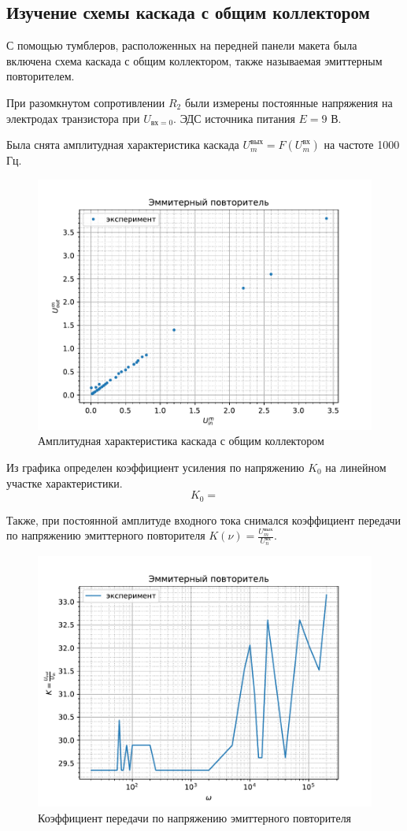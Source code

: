 \subsection{Изучение схемы каскада с общим коллектором}
С помощью тумблеров, расположенных на передней панели макета была включена схема каскада с общим коллектором, также называемая эмиттерным повторителем.

При разомкнутом сопротивлении $R_2$ были измерены постоянные напряжения на электродах транзистора при $U_{\text{вх}=0}$. 
ЭДС источника питания $E=9$ В.

Была снята амплитудная характеристика каскада 
$U_{m}^{\text{вых}}=F(U_m^{вх})$  на частоте 1000 Гц.

\begin{figure}[H]
 	\centering
 	\includegraphics[width=\linewidth]{fig/111_3.pdf}
 	\caption{Амплитудная характеристика каскада с общим коллектором}
 	\label{fig:111_3}
 \end{figure} 
 
Из графика определен коэффициент усиления по напряжению $K_0$ на линейном участке характеристики.
$$K_0=$$

Также, при постоянной амплитуде входного тока снимался коэффициент передачи по напряжению эмиттерного повторителя 
$\displaystyle K(\nu)=\frac{U_m^{\text{вых}}}{U_n^{\text{вх}}}$.

\begin{figure}[H]
 	\centering
 	\includegraphics[width=\linewidth]{fig/111_5.pdf}
 	\caption{Коэффициент передачи по напряжению эмиттерного повторителя}
 	\label{fig:111_5}
 \end{figure} 




